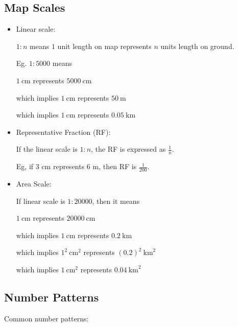 \documentclass[twocolumn]{article}
\begin{document}
\subsection*{Map Scales}

\begin{itemize}  
	
	\item Linear scale:
	
	$1: n$ means $1$ unit length on map represents $n$ units length on ground.
	
	Eg. $1 : 5000$ means
	
	$1 \mathrm{~cm}$ represents $5000 \mathrm{~cm}$
	
	which implies $1 \mathrm{~cm}$ represents $50 \mathrm{~m}$
	
	which implies $1 \mathrm{~cm}$ represents $0.05 \mathrm{~km}$
	
	\item Representative Fraction (RF):
	
	If the linear scale is $1:n$, the RF is expressed as $\frac{1}{n}$.
	
	Eg, if 3 cm represents 6 m, then RF is $\frac{1}{200}$.
	
	\item Area Scale:
	
	If linear scale is $1:20000$, then it means 
	
	$1 \mathrm{~cm}$ represents $20000 \mathrm{~cm}$
	
	which implies  $1 \mathrm{~cm}$ represents $0.2 \mathrm{~km}$
	
	which implies $1^2 \mathrm{~cm}^2$ represents $(0.2)^2 \mathrm{~km}^2$
	
	which implies $1 \mathrm{~cm}^2$ represents $0.04 \mathrm{~km}^2$

\end{itemize} 

\subsection*{Number Patterns}

\noindent
Common number patterns:
\end{document}
